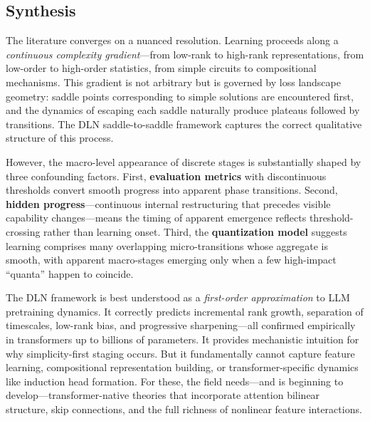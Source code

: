 \documentclass{article}
\theoremstyle{definition}
\begin{document}
\subsection{Synthesis}

The literature converges on a nuanced resolution. Learning proceeds along a \emph{continuous complexity gradient}---from low-rank to high-rank representations, from low-order to high-order statistics, from simple circuits to compositional mechanisms. This gradient is not arbitrary but is governed by loss landscape geometry: saddle points corresponding to simple solutions are encountered first, and the dynamics of escaping each saddle naturally produce plateaus followed by transitions. The DLN saddle-to-saddle framework captures the correct qualitative structure of this process.

However, the macro-level appearance of discrete stages is substantially shaped by three confounding factors. First, \textbf{evaluation metrics} with discontinuous thresholds convert smooth progress into apparent phase transitions. Second, \textbf{hidden progress}---continuous internal restructuring that precedes visible capability changes---means the timing of apparent emergence reflects threshold-crossing rather than learning onset. Third, the \textbf{quantization model} suggests learning comprises many overlapping micro-transitions whose aggregate is smooth, with apparent macro-stages emerging only when a few high-impact ``quanta'' happen to coincide.

The DLN framework is best understood as a \emph{first-order approximation} to LLM pretraining dynamics. It correctly predicts incremental rank growth, separation of timescales, low-rank bias, and progressive sharpening---all confirmed empirically in transformers up to billions of parameters. It provides mechanistic intuition for why simplicity-first staging occurs. But it fundamentally cannot capture feature learning, compositional representation building, or transformer-specific dynamics like induction head formation. For these, the field needs---and is beginning to develop---transformer-native theories that incorporate attention bilinear structure, skip connections, and the full richness of nonlinear feature interactions.
\end{document}
